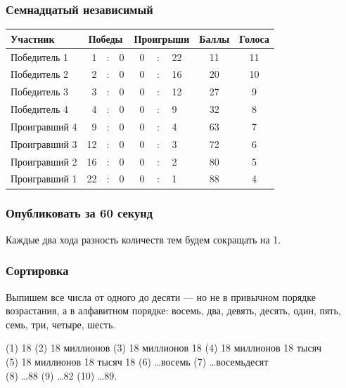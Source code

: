 \documentclass[aspectratio=1610,12pt]{beamer}
\begin{document}
\begin{frame} \frametitle{Семнадцатый независимый}

\newcommand{\vs}{&\hspace{-3mm}:&\hspace{-3mm}}
\begin{center} \begin{tabular}{|l|rcl|rcl|c|c|}
	\hline
	Участник & \multicolumn{3}{c|}{Победы}
		& \multicolumn{3}{c|}{Проигрыши}
		& Баллы & Голоса \\ \hline \hline
	Победитель 1 & 1 \vs 0 & 0 \vs 22 & 11 & 11 \\ \hline
	Победитель 2 & 2 \vs 0 & 0 \vs 16 & 20 & 10 \\ \hline
	Победитель 3 & 3 \vs 0 & 0 \vs 12 & 27 & 9 \\ \hline
	Победитель 4 & 4 \vs 0 & 0 \vs 9 & 32 & 8 \\ \hline \hline
	Проигравший 4 & 9 \vs 0 & 0 \vs 4 & 63 & 7 \\ \hline
	Проигравший 3 & 12 \vs 0 & 0 \vs 3 & 72 & 6 \\ \hline
	Проигравший 2 & 16 \vs 0 & 0 \vs 2 & 80 & 5 \\ \hline
	Проигравший 1 & 22 \vs 0 & 0 \vs 1 & 88 & 4 \\ \hline
\end{tabular} \end{center}

\end{frame}


\begin{frame} \frametitle{Опубликовать за 60 секунд}

Каждые два хода разность количеств тем будем сокращать на 1.
\end{frame}


\begin{frame} \frametitle{Сортировка}
Выпишем все числа от одного до десяти — но не в привычном порядке возрастания, а в алфавитном порядке: восемь, два, девять, десять, один, пять, семь, три, четыре, шесть. \medskip


(1) 18 (2) 18 миллионов (3) 18 миллионов 18 (4) 18 миллионов 18 тысяч \\
(5) 18 миллионов 18 тысяч 18 (6) \ldots восемь (7) \ldots восемьдесят \\
(8) \ldots 88 (9) \ldots 82 (10) \ldots 89.
\end{frame}
\end{document}
